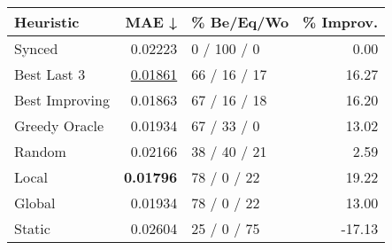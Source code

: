 \begin{tabular}{lrlr}
\toprule
\textbf{Heuristic} & \textbf{MAE ↓} & \textbf{\% Be/Eq/Wo} & \textbf{\% Improv.} \\
\midrule
            Synced &        0.02223 &          0 / 100 / 0 &                0.00 \\
\midrule
       Best Last 3 &        \underline{0.01861} &         66 / 16 / 17 &               16.27 \\
    Best Improving &        0.01863 &         67 / 16 / 18 &               16.20 \\
\addlinespace
     Greedy Oracle &        0.01934 &          67 / 33 / 0 &               13.02 \\
            Random &        0.02166 &         38 / 40 / 21 &                2.59 \\
\midrule
             Local &        \textbf{0.01796} &          78 / 0 / 22 &               19.22 \\
            Global &        0.01934 &          78 / 0 / 22 &               13.00 \\
\midrule
            Static &        0.02604 &          25 / 0 / 75 &              -17.13 \\
\bottomrule
\end{tabular}

\label{tab:non_lr01_le1_bs4_Summary}
